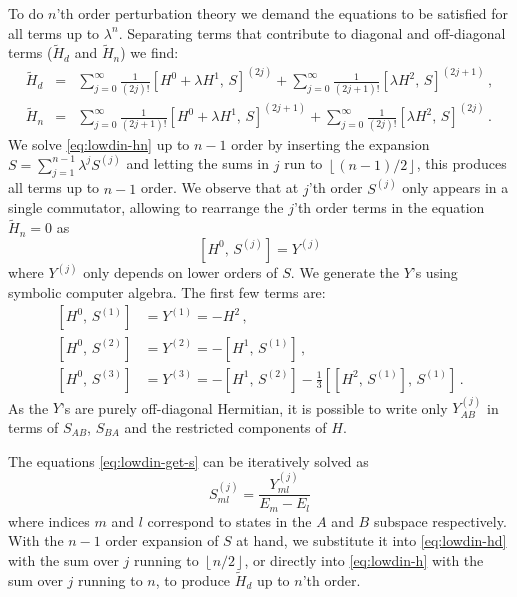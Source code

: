 \documentclass[10pt, onecolumn, aps, prb, superscriptaddress, floatfix, showpacs, notitlepage]{revtex4-1}
\begin{document}
To do $n$'th order perturbation theory we demand the equations to be satisfied for all terms up to $\lambda^n$.
Separating terms that contribute to diagonal and off-diagonal terms ($\tilde{H}_{d}$ and $\tilde{H}_{n}$) we find:
\begin{subequations}
\begin{eqnarray}
\label{eq:lowdin-hd}
\tilde{H}_{d}
    &=& \sum_{j=0}^{\infty}\frac{1}{(2j)!} [H^0 + \lambda H^1,\,S]^{(2j)}
    + \sum_{j=0}^{\infty}\frac{1}{(2j+1)!} [\lambda H^2,\,S]^{(2j+1)}\,,\\
\label{eq:lowdin-hn}
\tilde{H}_{n}
    &=& \sum_{j=0}^{\infty}\frac{1}{(2j+1)!} [H^0 + \lambda H^1,\,S]^{(2j+1)}
    + \sum_{j=0}^{\infty}\frac{1}{(2j)!} [\lambda H^2,\,S]^{(2j)}\,.
\end{eqnarray}
\end{subequations}
We solve \eqref{eq:lowdin-hn} up to $n-1$ order by inserting the expansion $S = \sum_{j = 1}^{n-1} \lambda^j S^{(j)}$ and letting the sums in $j$ run to $\left\lfloor (n-1)/2 \right\rfloor$, this produces all terms up to $n-1$ order.
We observe that at $j$'th order $S^{(j)}$ only appears in a single commutator, allowing to rearrange the $j$'th order terms in the equation $\tilde{H}_{n} = 0$ as
\begin{equation}
{[H^0,\,S^{(j)}]} = Y^{(j)}
\end{equation}
where $Y^{(j)}$ only depends on lower orders of $S$.
We generate the $Y$'s using symbolic computer algebra.
The first few terms are:
\begin{subequations}
\label{eq:lowdin-get-s}
\begin{align}
{[H^0,\,S^{(1)}]} &= Y^{(1)} = -H^2\,,\\
{[H^0,\,S^{(2)}]} &= Y^{(2)} = -[H^1,\,S^{(1)}]\,,\\
{[H^0,\,S^{(3)}]} &= Y^{(3)} = -[H^1,\,S^{(2)}] - \frac{1}{3} [[H^2,\,S^{(1)}],\,S^{(1)}]\,.
\end{align}
\end{subequations}
As the $Y$'s are purely off-diagonal Hermitian, it is possible to write only $Y^{(j)}_{AB}$ in terms of $S_{AB}$, $S_{BA}$ and the restricted components of $H$.

The equations \eqref{eq:lowdin-get-s} can be iteratively solved as
\begin{equation}
\label{eq:lowdin-s-from-y}
S^{(j)}_{ml} = \frac{Y^{(j)}_{ml}}{E_m - E_l}
\end{equation}
where indices $m$ and $l$ correspond to states in the $A$ and $B$ subspace respectively.
With the $n-1$ order expansion of $S$ at hand, we substitute it into \eqref{eq:lowdin-hd} with the sum over $j$ running to $\left\lfloor n/2 \right\rfloor$, or directly into \eqref{eq:lowdin-h} with the sum over $j$ running to $n$, to produce $\tilde{H}_{d}$ up to $n$'th order.
\end{document}
